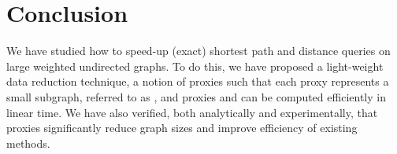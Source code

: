 \section{Conclusion}
\label{sec-con}

We have studied how to speed-up (exact)  shortest path and distance queries on large weighted undirected graphs.
To do this, we have proposed  a light-weight data reduction technique, a notion of proxies such that each proxy represents a small subgraph, referred to as \dras, and proxies and \dras can be computed efficiently in linear time.  We have also verified,
both analytically and experimentally, that proxies significantly reduce graph sizes and improve efficiency of existing methods.


